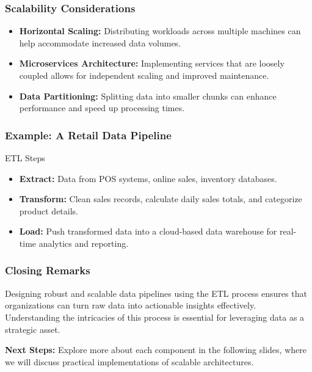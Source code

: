 \documentclass{beamer}
\begin{document}
\begin{frame}[fragile]
    \frametitle{Scalability Considerations}
    \begin{itemize}
        \item \textbf{Horizontal Scaling:} Distributing workloads across multiple machines can help accommodate increased data volumes.
        \item \textbf{Microservices Architecture:} Implementing services that are loosely coupled allows for independent scaling and improved maintenance.
        \item \textbf{Data Partitioning:} Splitting data into smaller chunks can enhance performance and speed up processing times.
    \end{itemize}
\end{frame}

\begin{frame}[fragile]
    \frametitle{Example: A Retail Data Pipeline}
    \begin{block}{ETL Steps}
        \begin{itemize}
            \item \textbf{Extract:} Data from POS systems, online sales, inventory databases.
            \item \textbf{Transform:} Clean sales records, calculate daily sales totals, and categorize product details.
            \item \textbf{Load:} Push transformed data into a cloud-based data warehouse for real-time analytics and reporting.
        \end{itemize}
    \end{block}
\end{frame}

\begin{frame}[fragile]
    \frametitle{Closing Remarks}
    Designing robust and scalable data pipelines using the ETL process ensures that organizations can turn raw data into actionable insights effectively. 
    Understanding the intricacies of this process is essential for leveraging data as a strategic asset.
    
    \vspace{0.5em}
    \textbf{Next Steps:} Explore more about each component in the following slides, where we will discuss practical implementations of scalable architectures.
\end{frame}
\end{document}
